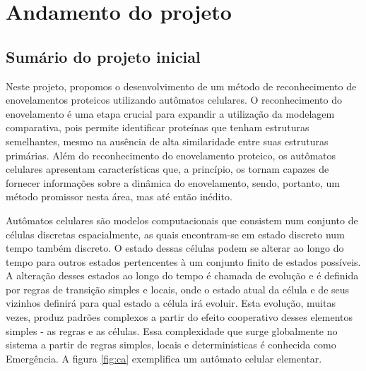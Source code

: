 \chapter{Andamento do projeto}\label{ch:introducao}
\section{Sumário do projeto inicial}
Neste projeto, propomos o desenvolvimento de um método de reconhecimento de enovelamentos proteicos utilizando autômatos celulares. O reconhecimento do enovelamento é uma etapa crucial para expandir a utilização da modelagem comparativa, pois permite identificar proteínas que tenham estruturas semelhantes, mesmo na ausência de alta similaridade entre suas estruturas primárias. Além do reconhecimento do enovelamento proteico, os autômatos celulares apresentam características que, a princípio, os tornam capazes de fornecer informações sobre a dinâmica do enovelamento, sendo, portanto, um método promissor nesta área, mas até então inédito.

Autômatos celulares são modelos computacionais que consistem num conjunto de células discretas espacialmente, as quais encontram-se em estado discreto num tempo também discreto. O estado dessas células podem se alterar ao longo do tempo para outros estados pertencentes à um conjunto finito de estados possíveis. A alteração desses estados ao longo do tempo é chamada de evolução e é definida por regras de transição simples e locais, onde o estado atual da célula e de seus vizinhos definirá para qual estado a célula irá evoluir. Esta evolução, muitas vezes, produz padrões complexos a partir do efeito cooperativo desses elementos simples - as regras e as células. Essa complexidade que surge globalmente no sistema a partir de regras simples, locais e determinísticas é conhecida como Emergência. A figura \ref{fig:ca} exemplifica um autômato celular elementar. 


